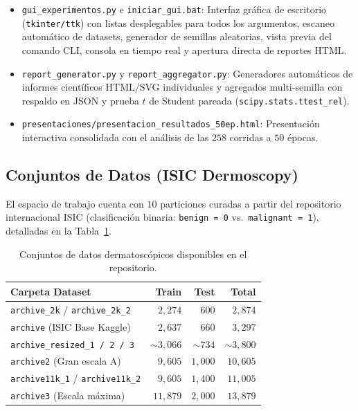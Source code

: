 \documentclass[10pt,a4paper,twocolumn]{article}
\begin{document}
\begin{itemize}[leftmargin=*,nosep]
  \item \texttt{gui\_experimentos.py} e \texttt{iniciar\_gui.bat}: Interfaz gráfica de escritorio (\texttt{tkinter/ttk}) con listas desplegables para todos los argumentos, escaneo automático de datasets, generador de semillas aleatorias, vista previa del comando CLI, consola en tiempo real y apertura directa de reportes HTML.
  \item \texttt{report\_generator.py} y \texttt{report\_aggregator.py}: Generadores automáticos de informes científicos HTML/SVG individuales y agregados multi-semilla con respaldo en JSON y prueba $t$ de Student pareada (\texttt{scipy.stats.ttest\_rel}).
  \item \texttt{presentaciones/presentacion\_resultados\_50ep.html}: Presentación interactiva consolidada con el análisis de las $258$ corridas a $50$ épocas.
\end{itemize}

\subsection{Conjuntos de Datos (ISIC Dermoscopy)}
El espacio de trabajo cuenta con $10$ particiones curadas a partir del repositorio internacional ISIC (clasificación binaria: \texttt{benign = 0} vs.\ \texttt{malignant = 1}), detalladas en la Tabla~\ref{tab:datasets}.

\begin{table}[H]
\centering
\caption{Conjuntos de datos dermatoscópicos disponibles en el repositorio.}
\label{tab:datasets}
\footnotesize
\begin{tabular}{lrrr}
\toprule
\textbf{Carpeta Dataset} & \textbf{Train} & \textbf{Test} & \textbf{Total} \\
\midrule
\texttt{archive\_2k} / \texttt{archive\_2k\_2} & $2{,}274$ & $600$ & $2{,}874$ \\
\texttt{archive} (ISIC Base Kaggle) & $2{,}637$ & $660$ & $3{,}297$ \\
\texttt{archive\_resized\_1 / 2 / 3} & $\sim 3{,}066$ & $\sim 734$ & $\sim 3{,}800$ \\
\texttt{archive2} (Gran escala A) & $9{,}605$ & $1{,}000$ & $10{,}605$ \\
\texttt{archive11k\_1} / \texttt{archive11k\_2} & $9{,}605$ & $1{,}400$ & $11{,}005$ \\
\texttt{archive3} (Escala máxima) & $11{,}879$ & $2{,}000$ & $13{,}879$ \\
\bottomrule
\end{tabular}
\end{table}
\end{document}
